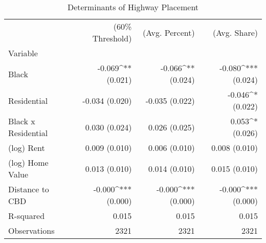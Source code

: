 \begin{table}[h]
\centering
\caption{Determinants of Highway Placement}
\label{tab:initial_results}
\begin{tabular*}{\textwidth}{@{\extracolsep{\fill}}l*{3}{r}}
\toprule
 & (60\% Threshold) & (Avg. Percent) & (Avg. Share) \\
Variable &  &  &  \\
\midrule
Black & -0.069^{**}
(0.021) & -0.066^{**}
(0.024) & -0.080^{***}
(0.024) \\
Residential & -0.034
(0.020) & -0.035
(0.022) & -0.046^{*}
(0.022) \\
Black x Residential & 0.030
(0.024) & 0.026
(0.025) & 0.053^{*}
(0.026) \\
(log) Rent & 0.009
(0.010) & 0.006
(0.010) & 0.008
(0.010) \\
(log) Home Value & 0.013
(0.010) & 0.014
(0.010) & 0.015
(0.010) \\
Distance to CBD & -0.000^{***}
(0.000) & -0.000^{***}
(0.000) & -0.000^{***}
(0.000) \\
R-squared & 0.015 & 0.015 & 0.015 \\
Observations & 2321 & 2321 & 2321 \\
\bottomrule
\end{tabular*}
\end{table}
